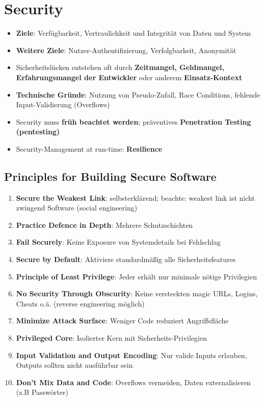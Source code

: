\section{Security}
\label{sc:sec:security}

\begin{itemize}
	\item \textbf{Ziele}: Verfügbarkeit, Vertraulichkeit und Integrität von Daten und System
	\item \textbf{Weitere Ziele}: Nutzer-Authentifizierung, Verfolgbarkeit, Anonymität
	\item Sicherheitslücken entstehen oft durch \textbf{Zeitmangel, Geldmangel, Erfahrungsmangel der Entwickler} oder anderem \textbf{Einsatz-Kontext}
	\item \textbf{Technische Gründe}: Nutzung von Pseudo-Zufall, Race Conditions, fehlende Input-Validierung (Overflows)
	\item Security muss \textbf{früh beachtet werden}; präventives \textbf{Penetration Testing (pentesting)}
	\item Security-Management at run-time: \textbf{Resilience}
\end{itemize}

\subsection{Principles for Building Secure Software}
\label{sc:sub:principles_for_building_secure_software}

\begin{enumerate}
	\item \textbf{Secure the Weakest Link}: selbsterklärend; beachte: weakest link ist nicht zwingend Software (social engineering)
	\item \textbf{Practice Defence in Depth}: Mehrere Schutzschichten
	\item \textbf{Fail Securely}: Keine Exposure von Systemdetails bei Fehlschlag
	\item \textbf{Secure by Default}: Aktiviere standardmäßig alle Sicherheitsfeatures
	\item \textbf{Principle of Least Privilege}: Jeder erhält nur minimale nötige Privilegien
	\item \textbf{No Security Through Obscurity}: Keine versteckten magic URLs, Logins, Cheats o.ä. (reverse engineering möglich)
	\item \textbf{Minimize Attack Surface}: Weniger Code reduziert Angriffsfläche
	\item \textbf{Privileged Core}: Isolierter Kern mit Sicherheits-Privilegien
	\item \textbf{Input Validation and Output Encoding}: Nur valide Inputs erlauben, Outputs sollten nicht ausführbar sein
	\item \textbf{Don't Mix Data and Code}: Overflows vermeiden, Daten externalisieren (z.B Passwörter)
\end{enumerate}

